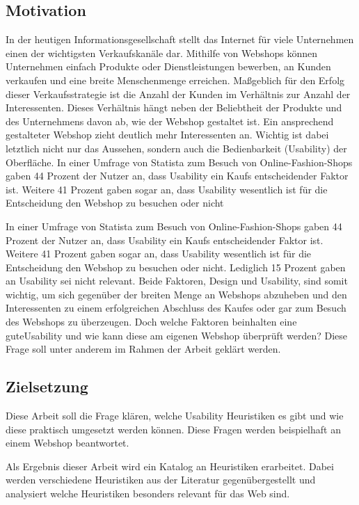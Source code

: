 \documentclass[utf8,biblatex]{lni}
\begin{document}
\subsection{Motivation}
In der heutigen Informationsgesellschaft stellt das Internet für viele Unternehmen einen der wichtigsten Verkaufskanäle dar. Mithilfe von Webshops können Unternehmen einfach Produkte oder Dienstleistungen bewerben, an Kunden verkaufen und eine breite Menschenmenge erreichen. Maßgeblich für den Erfolg dieser Verkaufsstrategie ist die Anzahl der Kunden im Verhältnis zur Anzahl der Interessenten. Dieses Verhältnis hängt neben der Beliebtheit der Produkte und des Unternehmens davon ab, wie der Webshop gestaltet ist. Ein ansprechend gestalteter Webshop zieht deutlich mehr Interessenten an. Wichtig ist dabei letztlich nicht nur das Aussehen, sondern auch die Bedienbarkeit (Usability) der Oberfläche. In einer Umfrage von Statista zum Besuch von Online-Fashion-Shops gaben 44 Prozent der Nutzer an, dass Usability ein Kaufs entscheidender Faktor ist. Weitere 41 Prozent gaben sogar an, dass Usability wesentlich ist für die Entscheidung den Webshop zu besuchen oder nicht

In einer Umfrage von Statista zum Besuch von Online-Fashion-Shops gaben 44 Prozent der Nutzer an, dass Usability ein Kaufs entscheidender Faktor ist. Weitere 41 Prozent gaben sogar an, dass Usability wesentlich ist für die Entscheidung den Webshop zu besuchen oder nicht. Lediglich 15 Prozent gaben an Usability sei nicht relevant.\cite{Statista.2022} Beide Faktoren, Design und Usability, sind somit wichtig, um sich gegenüber der breiten Menge an Webshops abzuheben und den Interessenten zu einem erfolgreichen Abschluss des Kaufes oder gar zum Besuch des Webshops zu überzeugen. Doch welche Faktoren beinhalten eine \glqq gute\grqq  Usability und wie kann diese am eigenen Webshop überprüft werden? Diese Frage soll unter anderem im Rahmen der Arbeit geklärt werden.


\subsection{Zielsetzung}
Diese Arbeit soll die Frage klären, welche Usability Heuristiken es gibt und wie diese praktisch umgesetzt werden können. Diese Fragen werden beispielhaft an einem Webshop beantwortet.

Als Ergebnis dieser Arbeit wird ein Katalog an Heuristiken erarbeitet. Dabei werden verschiedene Heuristiken aus der Literatur gegenübergestellt und analysiert welche Heuristiken besonders relevant für das Web sind. 
\end{document}
